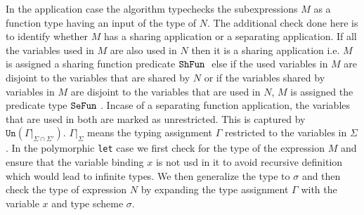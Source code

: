 In the application case the algorithm typechecks the subexpressions $M$ as a function type having
an input of the type of $N$. The additional check done here is to identify whether $M$ has a sharing
application or a separating application. If all the variables used in $M$ are also used in $N$ then
it is a sharing application i.e. $M$ is assigned a sharing function predicate $\texttt{ShFun}\ $
else if the used variables in $M$ are disjoint to the variables that
are shared by $N$ or if the variables shared by variables in $M$ are disjoint to the variables
that are used in $N$, $M$ is assigned the predicate type $\texttt{SeFun}\ $. Incase of a separating function
application, the variables that are used in both are marked as unrestricted. This is captured by
$\texttt{Un}(\Gamma|_{\Sigma \cap \Sigma'})$. $\Gamma|_{\Sigma}$ means the typing assignment $\Gamma$
restricted to the variables in $\Sigma$.
In the polymorphic \texttt{let} case we first check for the type of the expression $M$ and
ensure that the variable binding $x$ is not usd in it to avoid recursive definition which would
lead to infinite types. We then generalize the type to $\sigma$ and then check the type of expression $N$
by expanding the type assignment $\Gamma$ with the variable $x$ and type scheme $\sigma$.



